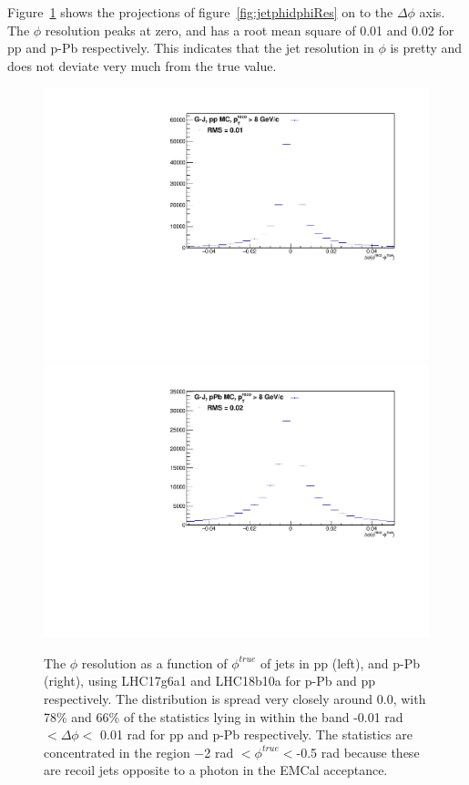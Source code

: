 Figure~\ref{fig:jetdphiRes} shows the projections of figure~\ref{fig:jetphidphiRes} on to the $\Delta\phi$ axis. The $\phi$ resolution peaks at zero, and has a root mean square of 0.01 and 0.02 for pp and p-Pb respectively. This indicates that the jet resolution in $\phi$ is pretty and does not deviate very much from the true value.
\begin{figure}[h]
\center
\includegraphics[width=.495\textwidth]{JetResponse/dphi_pp.pdf}
\includegraphics[width=.495\textwidth]{JetResponse/dphi_pPb.pdf}
\caption{The $\phi$ resolution as a function of $\phi^{true}$ of jets in pp (left), and p-Pb (right), using LHC17g6a1 and LHC18b10a for p-Pb and pp respectively. The distribution is spread very closely around 0.0, with 78\% and 66\% of the statistics lying in within the band -0.01 rad $< \Delta\phi <$ 0.01 rad for pp and p-Pb respectively. The statistics are concentrated in the region $-$2 rad $< \phi^{true} <$-0.5 rad because these are recoil jets opposite to a photon in the EMCal acceptance.}
\label{fig:jetdphiRes}
\end{figure}


